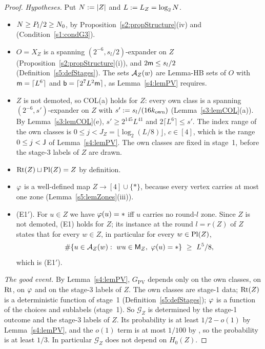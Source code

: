 \begin{proof}
\emph{Hypotheses.} Put $N\mathrel{:=}|Z|$ and $L\mathrel{:=} L_Z=\log_2N$.
\begin{itemize}
\item $N\ge P_l/2\ge N_{0}$, by Proposition~\ref{s2:propStructure}(iv) and  (Condition~\ref{s1:condG3}).
\item $O=X_Z$ is a spanning $(2^{-6},s_l/2)$-expander on $Z$ (Proposition~\ref{s2:propStructure}(i)), and $2\mathsf{m}\le s_l/2$ (Definition~\ref{s5:defStages}). The sets $\mathcal{A}_Z(w)$ are Lemma-HB sets of $O$ with $\mathsf{m}=\lceil L^6\rceil$ and $\mathsf{b}=\lceil 2^7L^2\mathsf{m}\rceil$, as Lemma~\ref{s4:lemPV} requires.
\item $Z$ is not demoted, so COL(a) holds for $Z$: every own class is a spanning $(2^{-6},s')$-expander on $Z$ with $s'\mathrel{:=} s_l/(16k_{\mathrm{own}})$ (Lemma~\ref{s3:lemCOL}(a)). By Lemma~\ref{s3:lemCOL}(e), $s'\ge 2^{145}L^{41}$ and $2\lceil L^6\rceil\le s'$. The index range of the own classes is $0\le j<J_Z=\lfloor\log_2(L/8)\rfloor$, $c\in[4]$, which is the range $0\le j<\mathsf{J}$ of Lemma~\ref{s4:lemPV}. The own classes are fixed in stage~1, before the stage-3 labels of $Z$ are drawn.
\item $\mathrm{Rt}(Z)\sqcup\mathrm{Pl}(Z)=Z$ by definition.
\item $\varphi$ is a well-defined map $Z\to[4]\cup\{*\}$, because every vertex carries at most one zone (Lemma~\ref{s5:lemZones}(iii)).
\item \textup{(E1$'$)}. For $u\in Z$ we have $\varphi(u)=*$ iff $u$ carries no round-$l$ zone. Since $Z$ is not demoted, (E1) holds for $Z$; its instance at the round $l=r(Z)$ of $Z$ states that for every $w\in Z$, in particular for every $w\in\mathrm{Pl}(Z)$,
\[
\#\{u\in\Aw_Z(w):\ wu\in\vM_Z,\ \extph(u)=*\}\ \ge\ L^5/8 ,
\]
which is \textup{(E1$'$)}.
\end{itemize}

\emph{The good event.} By Lemma~\ref{s4:lemPV}, $G_{\mathrm{PV}}$ depends only on the own classes, on $\mathrm{Rt}$, on $\varphi$ and on the stage-3 labels of $Z$. The own classes are stage-1 data; $\mathrm{Rt}(Z)$ is a deterministic function of stage~1 (Definition~\ref{s5:defStages}); $\varphi$ is a function of the choices and sublabels (stage~1). So $\mathcal G_Z$ is determined by the stage-1 outcome and the stage-3 labels of $Z$. Its probability is at least $1/2-o(1)$ by Lemma~\ref{s4:lemPV}, and the $o(1)$ term is at most $1/100$ by , so the probability is at least $1/3$. In particular $\mathcal G_Z$ does not depend on $H_0(Z)$.


\end{proof}
